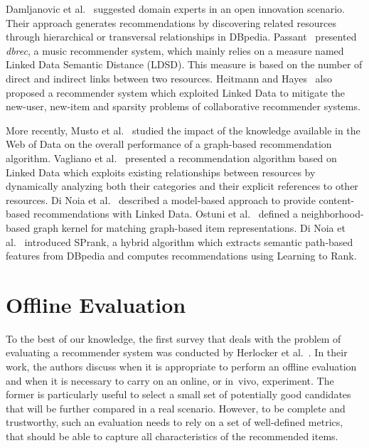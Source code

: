 Damljanovic et al.~\cite{Damljanovic2012} suggested domain experts in an open innovation scenario. Their approach generates recommendations by discovering related resources through hierarchical or transversal relationships in DBpedia. Passant~\cite{Passant2010} presented \emph{dbrec}, a music recommender system, which mainly relies on a measure named Linked Data Semantic Distance (LDSD). This measure is based on the number of direct and indirect links between two resources. Heitmann and Hayes~\cite{Heitmann2010} also proposed a recommender system which exploited Linked Data to mitigate the new-user, new-item and sparsity problems of collaborative recommender systems.

More recently, Musto et al.~\cite{Musto2016} studied the impact of the knowledge available in the Web of Data on the overall performance of a graph-based recommendation algorithm. Vagliano et al.~\cite{Vagliano2016} presented a recommendation algorithm based on Linked Data which exploits existing relationships between resources by dynamically analyzing both their categories and their explicit references to other resources. Di Noia et al.~\cite{DiNoia2012} described a model-based approach to provide content-based recommendations with Linked Data. Ostuni et al.~\cite{Ostuni2014} defined a neighborhood-based graph kernel for matching graph-based item representations. Di Noia et al.~\cite{DiNoia2016} introduced SPrank, a hybrid algorithm which extracts semantic path-based features from DBpedia and computes recommendations using Learning to Rank.

\section{Offline Evaluation}
\label{soa:sec:evaluation}

To the best of our knowledge, the first survey that deals with the problem of evaluating a recommender system was conducted by Herlocker et al.~\cite{Herlocker2004}. In their work, the authors discuss when it is appropriate to perform an offline evaluation and when it is necessary to carry on an online, or in~vivo, experiment. The former is particularly useful to select a small set of potentially good candidates that will be further compared in a real scenario. However, to be complete and trustworthy, such an evaluation needs to rely on a set of well-defined metrics, that should be able to capture all characteristics of the recommended items.

